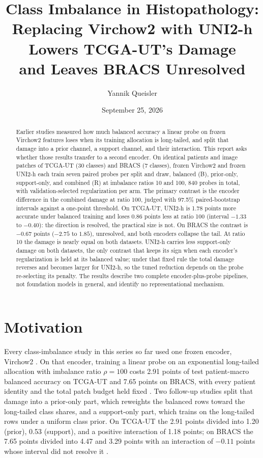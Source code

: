 \documentclass[11pt]{article}
\title{Class Imbalance in Histopathology:\\Replacing Virchow2 with {UNI2-h} Lowers {TCGA-UT}'s Damage\\and Leaves {BRACS} Unresolved}
\author{Yannik Queisler}
\date{September 25, 2026}
\begin{document}
\raggedbottom
{}
\setlength{\emergencystretch}{2em}
\maketitle
\begin{abstract}
\noindent Earlier studies measured how much balanced accuracy a linear probe on frozen Virchow2 features loses when its training allocation is long-tailed, and split that damage into a prior channel, a support channel, and their interaction. This report asks whether those results transfer to a second encoder. On identical patients and image patches of TCGA-UT (30 classes) and BRACS (7 classes), frozen Virchow2 and frozen UNI2-h each train seven paired probes per split and draw, balanced (B), prior-only, support-only, and combined (R) at imbalance ratios 10 and 100, 840 probes in total, with validation-selected regularization per arm. The primary contrast is the encoder difference in the combined damage at ratio 100, judged with 97.5\% paired-bootstrap intervals against a one-point threshold. On TCGA-UT, UNI2-h is 1.78 points more accurate under balanced training and loses 0.86 points less at ratio 100 (interval $-1.33$ to $-0.40$): the direction is resolved, the practical size is not. On BRACS the contrast is $-0.67$ points ($-2.75$ to $1.85$), unresolved, and both encoders collapse the tail. At ratio 10 the damage is nearly equal on both datasets. UNI2-h carries less support-only damage on both datasets, the only contrast that keeps its sign when each encoder's regularization is held at its balanced value; under that fixed rule the total damage reverses and becomes larger for UNI2-h, so the tuned reduction depends on the probe re-selecting its penalty. The results describe two complete encoder-plus-probe pipelines, not foundation models in general, and identify no representational mechanism.
\end{abstract}

\section{Motivation}
\label{sec:motivation}
Every class-imbalance study in this series so far used one frozen encoder, Virchow2 \citep{zimmermann2024virchow2}. On that encoder, training a linear probe on an exponential long-tailed allocation with imbalance ratio $\rho=100$ costs 2.91 points of test patient-macro balanced accuracy on TCGA-UT and 7.65 points on BRACS, with every patient identity and the total patch budget held fixed \citep{queisler2026prevalenceTcga, queisler2026prevalenceBracs}. Two follow-up studies split that damage into a prior-only part, which reweights the balanced rows toward the long-tailed class shares, and a support-only part, which trains on the long-tailed rows under a uniform class prior. On TCGA-UT the 2.91 points divided into 1.20 (prior), 0.53 (support), and a positive interaction of 1.18 points; on BRACS the 7.65 points divided into 4.47 and 3.29 points with an interaction of $-0.11$ points whose interval did not resolve it \citep{queisler2026causeTcga, queisler2026causeBracs}.
\end{document}
